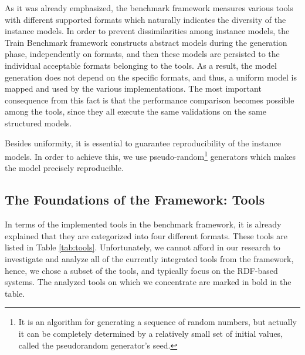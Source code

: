 As it was already emphasized, the benchmark framework measures various tools with different supported formats which naturally indicates the diversity of the instance models. In order to prevent dissimilarities among instance models, the Train Benchmark framework constructs abstract models during the generation phase, independently on formats, and then these models are persisted to the individual acceptable formats belonging to the tools. As a result, the model generation does not depend on the specific formats, and thus, a uniform model is mapped and used by the various implementations. The most important consequence from this fact is that the performance comparison becomes possible among the tools, since they all execute the same validations on the same structured models.

Besides uniformity, it is essential to guarantee reproducibility of the instance models. In order to achieve this, we use pseudo-random\footnote{It is an algorithm for generating a sequence of random numbers, but actually it can be completely
	determined by a relatively small set of initial values, called the pseudorandom generator's seed.} generators which makes the model precisely reproducible.

\subsection{The Foundations of the Framework: Tools}

In terms of the implemented tools in the benchmark framework, it is already explained that they are categorized into four different formats. These tools are listed in Table \ref{tab:tools}. Unfortunately, we cannot afford in our research to investigate and analyze all of the currently integrated tools from the framework, hence, we chose a subset of the tools, and typically focus on the RDF-based systems. The analyzed tools on which we concentrate are marked in bold in the table.

